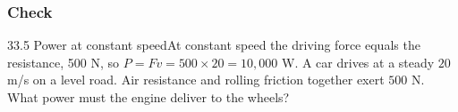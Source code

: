 \documentclass[11pt]{article}
\begin{document}
\subsubsection{Check}\mbox{}

\begin{q}{3}{3.5 Power at constant speed}{At constant speed the driving force equals the resistance, 500 N, so $P = Fv = 500 \times 20 = 10{,}000$ W.}
A car drives at a steady $20$ m/s on a level road. Air resistance and rolling friction together exert $500$ N. What power must the engine deliver to the wheels?
\end{q}

\makekey
\end{document}

